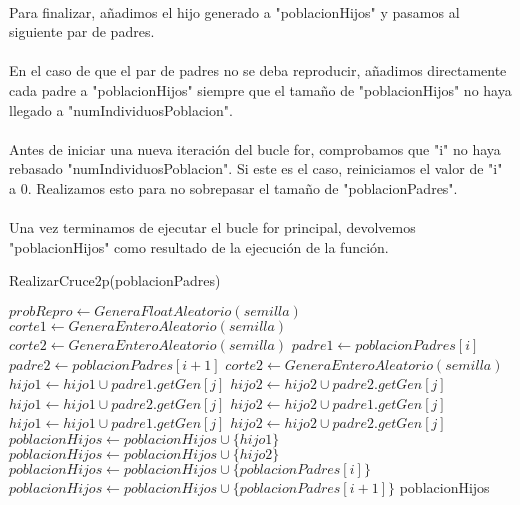 	\paragraph{}Para finalizar, añadimos el hijo generado a "poblacionHijos" y pasamos al siguiente par de padres.
	
	\paragraph{}En el caso de que el par de padres no se deba reproducir, añadimos directamente cada padre a "poblacionHijos" siempre que el tamaño de "poblacionHijos" no haya llegado a "numIndividuosPoblacion".
	
	\paragraph{}Antes de iniciar una nueva iteración del bucle for, comprobamos que "i" no haya rebasado "numIndividuosPoblacion". Si este es el caso, reiniciamos el valor de "i" a 0. Realizamos esto para no sobrepasar el tamaño de "poblacionPadres".
	
	\paragraph{}Una vez terminamos de ejecutar el bucle for principal, devolvemos "poblacionHijos" como resultado de la ejecución de la función.

	\begin{algorithm}[H]
		\caption{RealizarCruce2p(poblacionPadres)}
		\begin{algorithmic}
			
				\STATE $probRepro \leftarrow GeneraFloatAleatorio(semilla)$
					\STATE $corte1 \leftarrow GeneraEnteroAleatorio(semilla)$
					\STATE $corte2 \leftarrow GeneraEnteroAleatorio(semilla)$
					\STATE $padre1 \leftarrow poblacionPadres[i]$
					\STATE $padre2 \leftarrow poblacionPadres[i+1]$
						\STATE $corte2 \leftarrow GeneraEnteroAleatorio(semilla)$
					\ENDWHILE
						\STATE $hijo1 \leftarrow hijo1\cup padre1.getGen[j]$
						\STATE $hijo2 \leftarrow hijo2\cup padre2.getGen[j]$
					\ENDFOR
						\STATE $hijo1 \leftarrow hijo1\cup padre2.getGen[j]$
						\STATE $hijo2 \leftarrow hijo2\cup padre1.getGen[j]$
					\ENDFOR
						\STATE $hijo1 \leftarrow hijo1\cup padre1.getGen[j]$
						\STATE $hijo2 \leftarrow hijo2\cup padre2.getGen[j]$
					\ENDFOR
					\STATE $poblacionHijos \leftarrow poblacionHijos\cup\{hijo1\}$
					\STATE $poblacionHijos \leftarrow poblacionHijos\cup\{hijo2\}$
				\ELSE
					\STATE $poblacionHijos \leftarrow poblacionHijos\cup\{poblacionPadres[i]\}$
					\STATE $poblacionHijos \leftarrow poblacionHijos\cup\{poblacionPadres[i+1]\}$
				\ENDIF
			\ENDFOR
			\RETURN poblacionHijos
		\end{algorithmic}
	\end{algorithm}

